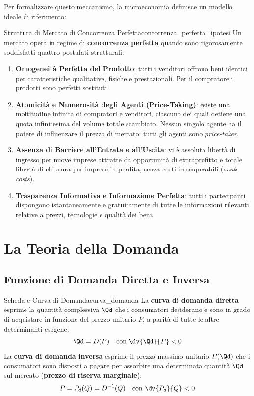 Per formalizzare questo meccanismo, la microeconomia definisce un modello ideale di riferimento:

\begin{modello}{Struttura di Mercato di Concorrenza Perfetta}{concorrenza_perfetta_ipotesi}
Un mercato opera in regime di \textbf{concorrenza perfetta} quando sono rigorosamente soddisfatti quattro postulati strutturali:
\begin{enumerate}
    \item \textbf{Omogeneità Perfetta del Prodotto}: tutti i venditori offrono beni identici per caratteristiche qualitative, fisiche e prestazionali. Per il compratore i prodotti sono perfetti sostituti.
    \item \textbf{Atomicità e Numerosità degli Agenti (Price-Taking)}: esiste una moltitudine infinita di compratori e venditori, ciascuno dei quali detiene una quota infinitesima del volume totale scambiato. Nessun singolo agente ha il potere di influenzare il prezzo di mercato: tutti gli agenti sono \textit{price-taker}.
    \item \textbf{Assenza di Barriere all'Entrata e all'Uscita}: vi è assoluta libertà di ingresso per nuove imprese attratte da opportunità di extraprofitto e totale libertà di chiusura per imprese in perdita, senza costi irrecuperabili (\textit{sunk costs}).
    \item \textbf{Trasparenza Informativa e Informazione Perfetta}: tutti i partecipanti dispongono istantaneamente e gratuitamente di tutte le informazioni rilevanti relative a prezzi, tecnologie e qualità dei beni.
\end{enumerate}
\end{modello}

\section{La Teoria della Domanda}

\subsection{Funzione di Domanda Diretta e Inversa}

\begin{definizione}{Scheda e Curva di Domanda}{curva_domanda}
La \textbf{curva di domanda diretta} esprime la quantità complessiva $\Qd$ che i consumatori desiderano e sono in grado di acquistare in funzione del prezzo unitario $P$, a parità di tutte le altre determinanti esogene:
\begin{equation}
    \Qd = D(P) \quad \text{con } \dv{\Qd}{P} < 0
\end{equation}
La \textbf{curva di domanda inversa} esprime il prezzo massimo unitario $P(\Qd)$ che i consumatori sono disposti a pagare per assorbire una determinata quantità $\Qd$ sul mercato (\textbf{prezzo di riserva marginale}):
\begin{equation}
    P = P_d(Q) = D^{-1}(Q) \quad \text{con } \dv{P_d}{Q} < 0
\end{equation}
\end{definizione}

